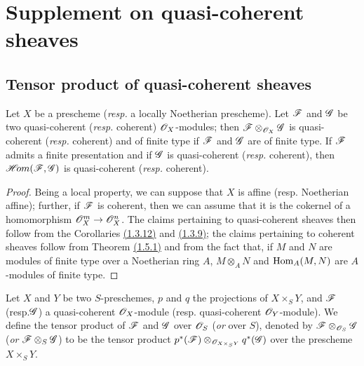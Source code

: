 \section{Supplement on quasi-coherent sheaves}
\label{section-supplement-on-qcoh}

\subsection{Tensor product of quasi-coherent sheaves}
\label{subsection-tensor-product-of-qcoh}

\begin{prop}[9.1.1]
\label{prop-1.9.1.1}
Let $X$ be a prescheme ({\em resp.} a locally Noetherian prescheme). Let $\mathscr{F}$ and
$\mathscr{G}$ be two quasi-coherent ({\em resp.} coherent) $\mathscr{O}_X$-modules; then
$\mathscr{F}\otimes_{\mathscr{O}_X}\mathscr{G}$ is quasi-coherent ({\em resp.} coherent) and
of finite type if $\mathscr{F}$ and $\mathscr{G}$ are of finite type. If
$\mathscr{F}$ admits a finite presentation and if $\mathscr{G}$ is quasi-coherent
({\em resp.} coherent), then $\mathscr{H}\!{om}(\mathscr{F},\mathscr{G})$ is quasi-coherent
({\em resp.} coherent).
\end{prop}

\begin{proof}
\label{proof-prop-1.9.1.1}
Being a local property, we can suppose that $X$ is affine (resp. Noetherian
affine); further, if $\mathscr{F}$ is coherent, then we can assume that it is the
cokernel of a homomorphism $\mathscr{O}_X^m\to\mathscr{O}_X^n$. The claims pertaining to
quasi-coherent sheaves then follow from the Corollaries \hyperref[cor-1.1.3.12]{(1.3.12)} and \hyperref[cor-1.1.3.9]{(1.3.9)}; the
claims pertaining to coherent sheaves follow from Theorem \hyperref[thm-1.1.5.1]{(1.5.1)} and from the fact
that, if $M$ and $N$ are modules of finite type over a Noetherian ring $A$,
$M\otimes_A N$ and ${\mathop{\mathrm{Hom}}\nolimits}_A(M,N)$ are $A$-modules of finite type.
\end{proof}

\begin{defn}[9.1.2]
\label{defn-1.9.1.2}
Let $X$ and $Y$ be two $S$-preschemes, $p$ and
$q$ the projections of $X\times_S Y$, and $\mathscr{F}$ (resp.$\mathscr{G}$) a
quasi-coherent $\mathscr{O}_X$-module (resp. quasi-coherent $\mathscr{O}_Y$-module). We define the
tensor product of $\mathscr{F}$ and $\mathscr{G}$ over $\mathscr{O}_S$ ({\em or} over $S$),
denoted by $\mathscr{F}\otimes_{\mathscr{O}_S}\mathscr{G}$ ({\em or}
$\mathscr{F}\otimes_S\mathscr{G}$) to be the tensor product
$p^*(\mathscr{F})\otimes_{\mathscr{O}_{X\times_S Y}}q^*(\mathscr{G})$ over the
prescheme $X\times_S Y$.
\end{defn}

